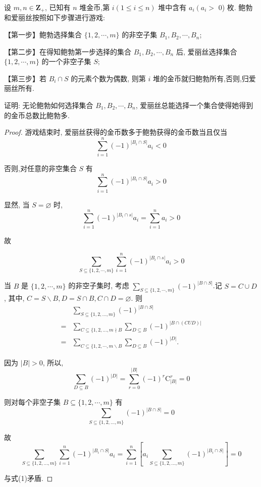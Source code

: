\begin{example}
	设 $m, n \in \mathbf{Z}_{+}$, 已知有 $n$ 堆金币,第 $i(1 \leqslant i \leqslant n)$ 堆中含有 $a_{i}\left(a_{i}>\right.$ 0) 枚. 鲍勃和爱丽丝按照如下步骤进行游戏:

		【第一步】鲍勃选择集合 $\{1,2, \cdots, m\}$ 的非空子集 $B_{1}, B_{2}, \cdots, B_{n}$;

		【第二步】在得知鲍勃第一步选择的集合 $B_{1}, B_{2}, \cdots, B_{n}$ 后, 爱丽丝选择集合 $\{1,2, \cdots, m\}$ 的一个非空子集 $S ;$

		【第三步】若 $B_{i} \cap S$ 的元素个数为偶数, 则第 $i$ 堆的金币就归鲍勃所有,否则,归爱丽丝所有.

		证明: 无论鲍勃如何选择集合 $B_{1}, B_{2}, \cdots, B_{n}$, 爱丽丝总能选择一个集合使得她得到的金币总数比鲍勃多.
\end{example}

\begin{proof}
	游戏结束时, 爱丽丝获得的金币数多于鲍勃获得的金币数当且仅当
	$$
		\sum_{i=1}^{n}(-1)^{\left|B_{i} \cap S\right|} a_{i}<0
	$$

	否则,对任意的非空集合 $S$ 有
	$$
		\sum_{i=1}^{n}(-1)^{\left|B_{i} \cap S\right|} a_{i}>0
	$$

	显然, 当 $S=\varnothing$ 时,
	$$
		\sum_{i=1}^{n}(-1)^{\left|B_{i} \cap s\right|} a_{i}=\sum_{i=1}^{n} a_{i}>0
	$$

	故


	\begin{equation*}
		\sum_{S \subseteq\{1,2, \cdots, m\}} \sum_{i=1}^{n}(-1)^{\left|B_{i} \cap s\right|} a_{i}>0 \tag{1}
	\end{equation*}


	当 $B$ 是 $\{1,2, \cdots, m\}$ 的非空子集时, 考虑 $\sum_{S \subseteq\{1,2, \cdots, m\}}(-1)^{|B \cap S|}$.记 $S=C \cup D$, 其中, $C=S \backslash B, D=S \cap B, C \cap D=\varnothing$. 则
	$$
		\begin{aligned}
			  & \sum_{S \subseteq\{1,2, \ldots, m\}}(-1)^{|B \cap S|}                                 \\
			= & \sum_{C \subseteq\{1,2, \ldots, m \nmid B} \sum_{D \subseteq B}(-1)^{|B \cap(C U D)|} \\
			= & \sum_{C \subseteq\{1,2, \cdots, m \backslash B} \sum_{D \subseteq B}(-1)^{|D|} .
		\end{aligned}
	$$

	因为 $|B|>0$, 所以,
	$$
		\sum_{D \subseteq B}(-1)^{|D|}=\sum_{r=0}^{|B|}(-1)^{r} \mathrm{C}_{|B|}^{r}=0
	$$

	则对每个非空子集 $B \subseteq\{1,2, \cdots, m\}$ 有
	$$
		\sum_{S \subseteq\{1,2, \ldots, m\}}(-1)^{|B \cap S|}=0
	$$

	故
	$$
		\sum_{S \subseteq\{1,2, \ldots, m\}} \sum_{i=1}^{n}(-1)^{\left|B_{i} \cap S\right|} a_{i}=\sum_{i=1}^{n}\left[a_{i} \sum_{S \subseteq\{1,2, \ldots, m\}}(-1)^{\left|B_{i} \cap S\right|}\right]=0
	$$

	与式(1)矛盾.
\end{proof}

